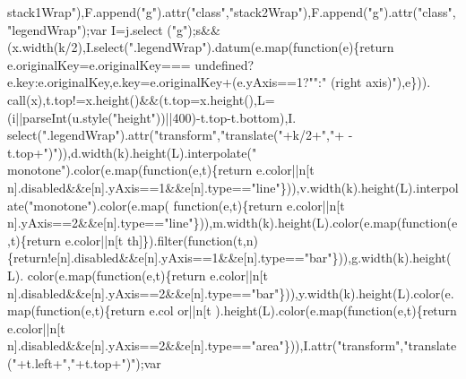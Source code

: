\begin{DoxyCode}
{      stack1Wrap"}),F.append(\textcolor{stringliteral}{"g"}).attr(\textcolor{stringliteral}{"class"},\textcolor{stringliteral}{"stack2Wrap"}),F.append(\textcolor{stringliteral}{"g"}).attr(\textcolor{stringliteral}{"class"},\textcolor{stringliteral}{"legendWrap"});var I=j.select
      (\textcolor{stringliteral}{"g"});s&&(x.width(k/2),I.select(\textcolor{stringliteral}{".legendWrap"}).datum(e.map(\textcolor{keyword}{function}(e)\{return e.originalKey=e.originalKey===
      undefined?e.key:e.originalKey,e.key=e.originalKey+(e.yAxis==1?\textcolor{stringliteral}{""}:\textcolor{stringliteral}{" (right axis)"}),e\})).
      call(x),t.top!=x.height()&&(t.top=x.height(),L=(i||parseInt(u.style(\textcolor{stringliteral}{"height"}))||400)-t.top-t.bottom),I.
      select(\textcolor{stringliteral}{".legendWrap"}).attr(\textcolor{stringliteral}{"transform"},\textcolor{stringliteral}{"translate("}+k/2+\textcolor{stringliteral}{","}+ -t.top+\textcolor{stringliteral}{")"})),d.width(k).height(L).interpolate(\textcolor{stringliteral}{"
      monotone"}).color(e.map(\textcolor{keyword}{function}(e,t)\{return e.color||n[t%
      n].disabled&&e[n].yAxis==1&&e[n].type==\textcolor{stringliteral}{"line"}\})),v.width(k).height(L).interpolate(\textcolor{stringliteral}{"monotone"}).color(e.map(\textcolor{keyword}{
      function}(e,t)\{return e.color||n[t%
      n].yAxis==2&&e[n].type==\textcolor{stringliteral}{"line"}\})),m.width(k).height(L).color(e.map(\textcolor{keyword}{function}(e,t)\{return e.color||n[t%
      th]\}).filter(\textcolor{keyword}{function}(t,n)\{\textcolor{keywordflow}{return}!e[n].disabled&&e[n].yAxis==1&&e[n].type==\textcolor{stringliteral}{"bar"}\})),g.width(k).height(L).
      color(e.map(\textcolor{keyword}{function}(e,t)\{return e.color||n[t%
      n].disabled&&e[n].yAxis==2&&e[n].type==\textcolor{stringliteral}{"bar"}\})),y.width(k).height(L).color(e.map(\textcolor{keyword}{function}(e,t)\{return e.col
      or||n[t%
      ).height(L).color(e.map(\textcolor{keyword}{function}(e,t)\{return e.color||n[t%
      n].disabled&&e[n].yAxis==2&&e[n].type==\textcolor{stringliteral}{"area"}\})),I.attr(\textcolor{stringliteral}{"transform"},\textcolor{stringliteral}{"translate("}+t.left+\textcolor{stringliteral}{","}+t.top+\textcolor{stringliteral}{")"});var 

\end{DoxyCode}
